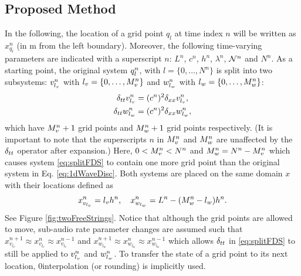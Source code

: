 \documentclass[fleqn]{jaes}
\def\SBcomment[#1]{\textcolor{red}{#1}}
\def\SWcomment[#1]{\textcolor{blue}{#1}}
\begin{document}
\subsection{Proposed Method}
In the following, the location of a grid point $q_l$ at time index $n$ will be written as $x_{q_l}^n$ (in m from the left boundary). Moreover, the following time-varying parameters are indicated with a superscript $n$: $L^n$, $c^n$, $h^n$, $\lambda^n$, $\mathcal{N}^n$ and $N^n$. %
As a starting point, the original system $q_l^n$, with $l=\{0, \hdots, N^n\}$ is split into two subsystems: $v_{l_v}^n$ with $l_v=\{0, \hdots, M_v^n\}$ and $w_{l_w}^n$ with  $l_w=\{0, \hdots, M_w^n\}$:
\begin{subequations}\label{eq:splitFDS}
    \begin{align}
        \delta_{tt} v_{l_v}^n &= (c^n)^2\delta_{xx} v_{l_v}^n,\\
        \delta_{tt} w_{l_w}^n &= (c^n)^2\delta_{xx} w_{l_w}^n,
    \end{align}
\end{subequations}
which have $M_v^n+1$ grid points and $M_w^n+1$ grid points respectively. (It is important to note that the superscripts $n$ in $M_v^n$ and $M_w^n$ are unaffected by the $\delta_{tt}$ operator after expansion.) Here, $0<M_v^n<N^n$ and $M_w^n = N^n - M_v^n$ which causes system \eqref{eq:splitFDS} to contain one more grid point than the original system in Eq. \eqref{eq:1dWaveDisc}. Both systems are placed on the same domain $x$ with their locations defined as
\begin{equation}\label{eq:gridLocations}
    x_{v_\lv}^n =\lv h^n, \quad x_{w_\lw}^n = L^n-(\Mw-\lw)h^n.
\end{equation}
% 
See Figure \ref{fig:twoFreeStrings}. Notice that although the grid points are allowed to move, sub-audio rate parameter changes are assumed such that $x^{n+1}_{v_{l_v}} \approx x^{n}_{v_{l_v}} \approx x^{n-1}_{v_{l_v}}$ and $x^{n+1}_{w_{l_w}} \approx x^{n}_{w_{l_w}}  \approx x^{n-1}_{w_{l_w}}$ which allows $\delta_{tt}$ in \eqref{eq:splitFDS} to still be applied to $v_{l_v}^n$ and $w_{l_w}^n$. To transfer the state of a grid point to its next location, $0$\thOrder interpolation (or rounding) is implicitly used. 
\end{document}
